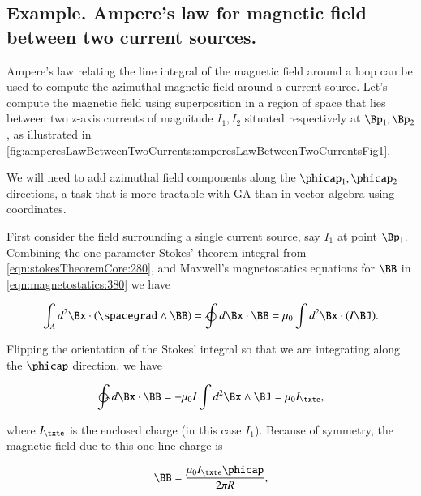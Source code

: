 %
%
\subsection{Example.  Ampere's law for magnetic field between two current sources.}

Ampere's law relating the line integral of the magnetic field around a loop can be used to compute the azimuthal magnetic field around a current source.
Let's compute the magnetic field using superposition in a region of space that lies between two z-axis currents of magnitude \( I_1, I_2 \) situated respectively at \( \Bp_1, \Bp_2 \), as illustrated in
\cref{fig:amperesLawBetweenTwoCurrents:amperesLawBetweenTwoCurrentsFig1}.


We will need to add azimuthal field components along the \( \phicap_1, \phicap_2 \) directions, a task that is more tractable with GA than in vector algebra using coordinates.

First consider the field surrounding a single current source, say \( I_1 \) at point \( \Bp_1 \).
Combining the one parameter Stokes' theorem integral from \cref{eqn:stokesTheoremCore:280}, and Maxwell's magnetostatics equations for \( \BB \) in \cref{eqn:magnetostatics:380} we have

\begin{dmath}\label{eqn:maxwells:20}
\int_A d^2 \Bx \cdot (\spacegrad \wedge \BB) = \ointclockwise d\Bx \cdot \BB = \mu_0 \int d^2 \Bx \cdot (I \BJ).
\end{dmath}

Flipping the orientation of the Stokes' integral so that we are integrating along the \( \phicap \) direction, we have

\begin{dmath}\label{eqn:maxwells:40}
\ointctrclockwise d\Bx \cdot \BB
= -\mu_0 I \int d^2 \Bx \wedge \BJ
= \mu_0 I_\txte,
\end{dmath}

where \( I_\txte \) is the enclosed charge (in this case \( I_1 \)).
Because of symmetry, the magnetic field due to this one line charge is

\begin{dmath}\label{eqn:maxwells:60}
\BB
= \frac{\mu_0 I_\txte \phicap}{2 \pi R},
\end{dmath}

